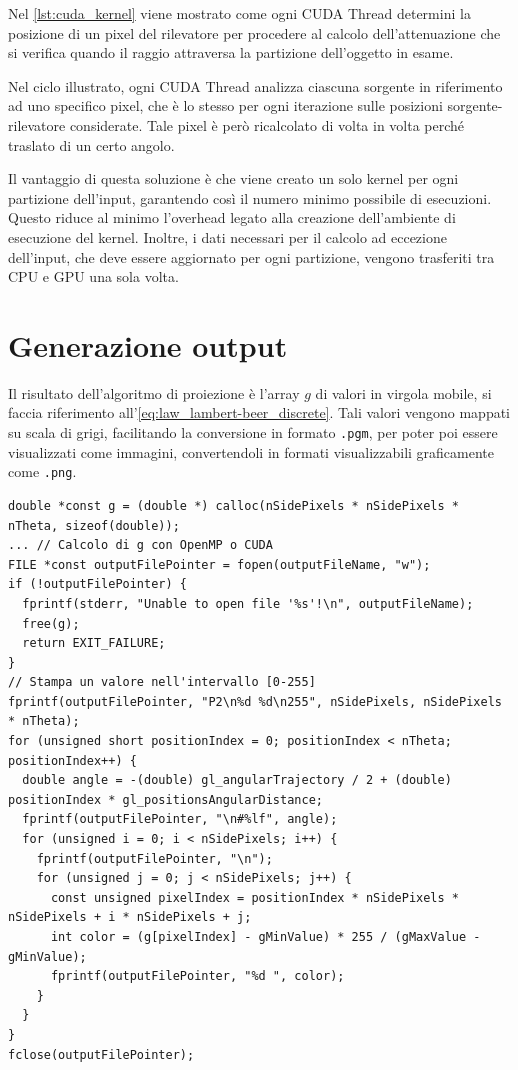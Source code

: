 \documentclass[12pt,a4paper]{report}
\begin{document}
Nel \autoref{lst:cuda_kernel} viene mostrato come ogni CUDA Thread determini la posizione di un pixel del rilevatore per procedere
al calcolo dell'attenuazione che si verifica quando il raggio attraversa la partizione dell'oggetto in esame.

Nel ciclo illustrato, ogni CUDA Thread analizza ciascuna sorgente in riferimento ad uno specifico pixel, che è lo stesso per ogni
iterazione sulle posizioni sorgente-rilevatore considerate.
Tale pixel è però ricalcolato di volta in volta perché traslato di un certo angolo.

Il vantaggio di questa soluzione è che viene creato un solo kernel per ogni partizione dell'input, garantendo così il numero
minimo possibile di esecuzioni.
Questo riduce al minimo l'overhead legato alla creazione dell'ambiente di esecuzione del kernel.
Inoltre, i dati necessari per il calcolo ad eccezione dell'input, che deve essere aggiornato per ogni partizione, vengono
trasferiti tra CPU e GPU una sola volta.

\section{Generazione output}

Il risultato dell'algoritmo di proiezione è l'array \(g\) di valori in virgola mobile, si faccia riferimento
all'\autoref{eq:law_lambert-beer_discrete}.
Tali valori vengono mappati su scala di grigi, facilitando la conversione in formato \lstinline{.pgm}, per poter poi essere
visualizzati come immagini, convertendoli in formati visualizzabili graficamente come \lstinline{.png}.

\begin{lstlisting}[language=CStyle, caption={Codice C per la mappatura dell'output in immagini.}, label={lst:outputs}]
double *const g = (double *) calloc(nSidePixels * nSidePixels * nTheta, sizeof(double));
... // Calcolo di g con OpenMP o CUDA
FILE *const outputFilePointer = fopen(outputFileName, "w");
if (!outputFilePointer) {
  fprintf(stderr, "Unable to open file '%s'!\n", outputFileName);
  free(g);
  return EXIT_FAILURE;
}
// Stampa un valore nell'intervallo [0-255]
fprintf(outputFilePointer, "P2\n%d %d\n255", nSidePixels, nSidePixels * nTheta);
for (unsigned short positionIndex = 0; positionIndex < nTheta; positionIndex++) {
  double angle = -(double) gl_angularTrajectory / 2 + (double) positionIndex * gl_positionsAngularDistance;
  fprintf(outputFilePointer, "\n#%lf", angle);
  for (unsigned i = 0; i < nSidePixels; i++) {
    fprintf(outputFilePointer, "\n");
    for (unsigned j = 0; j < nSidePixels; j++) {
      const unsigned pixelIndex = positionIndex * nSidePixels * nSidePixels + i * nSidePixels + j;
      int color = (g[pixelIndex] - gMinValue) * 255 / (gMaxValue - gMinValue);
      fprintf(outputFilePointer, "%d ", color);
    }
  }
}
fclose(outputFilePointer);
\end{lstlisting}
\end{document}
